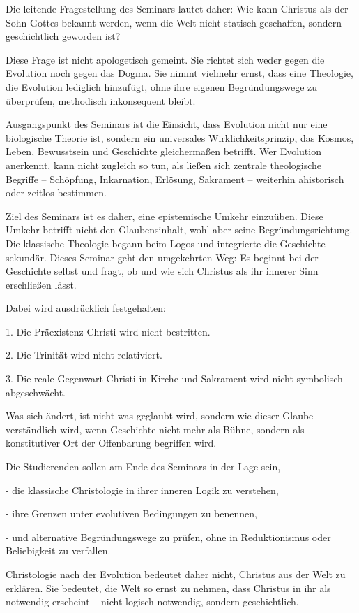 \documentclass[
  ngerman,
]{article}
\begin{document}
Die leitende Fragestellung des Seminars lautet daher: Wie kann Christus
als der Sohn Gottes bekannt werden, wenn die Welt nicht statisch
geschaffen, sondern geschichtlich geworden ist?

Diese Frage ist nicht apologetisch gemeint. Sie richtet sich weder gegen
die Evolution noch gegen das Dogma. Sie nimmt vielmehr ernst, dass eine
Theologie, die Evolution lediglich hinzufügt, ohne ihre eigenen
Begründungswege zu überprüfen, methodisch inkonsequent bleibt.

Ausgangspunkt des Seminars ist die Einsicht, dass Evolution nicht nur
eine biologische Theorie ist, sondern ein universales
Wirklichkeitsprinzip, das Kosmos, Leben, Bewusstsein und Geschichte
gleichermaßen betrifft. Wer Evolution anerkennt, kann nicht zugleich so
tun, als ließen sich zentrale theologische Begriffe -- Schöpfung,
Inkarnation, Erlösung, Sakrament -- weiterhin ahistorisch oder zeitlos
bestimmen.

Ziel des Seminars ist es daher, eine epistemische Umkehr einzuüben.
Diese Umkehr betrifft nicht den Glaubensinhalt, wohl aber seine
Begründungsrichtung. Die klassische Theologie begann beim Logos und
integrierte die Geschichte sekundär. Dieses Seminar geht den umgekehrten
Weg: Es beginnt bei der Geschichte selbst und fragt, ob und wie sich
Christus als ihr innerer Sinn erschließen lässt.

Dabei wird ausdrücklich festgehalten:

1. Die Präexistenz Christi wird nicht bestritten.

2. Die Trinität wird nicht relativiert.

3. Die reale Gegenwart Christi in Kirche und Sakrament wird nicht
symbolisch abgeschwächt.

Was sich ändert, ist nicht was geglaubt wird, sondern wie dieser Glaube
verständlich wird, wenn Geschichte nicht mehr als Bühne, sondern als
konstitutiver Ort der Offenbarung begriffen wird.

Die Studierenden sollen am Ende des Seminars in der Lage sein,

- die klassische Christologie in ihrer inneren Logik zu verstehen,

- ihre Grenzen unter evolutiven Bedingungen zu benennen,

- und alternative Begründungswege zu prüfen, ohne in Reduktionismus oder
Beliebigkeit zu verfallen.

Christologie nach der Evolution bedeutet daher nicht, Christus aus der
Welt zu erklären. Sie bedeutet, die Welt so ernst zu nehmen, dass
Christus in ihr als notwendig erscheint -- nicht logisch notwendig,
sondern geschichtlich.
\end{document}
